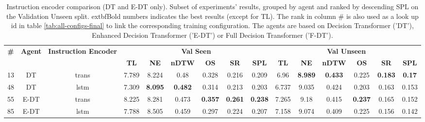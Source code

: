 \begin{table}
\centering
\caption{\label{tab:instruction_encoding}Instruction encoder comparison (DT and E-DT only). Subset of experiments' results, grouped by agent and ranked by descending SPL on the Validation Unseen split. 	extbf{Bold} numbers indicates the best results (except for TL). The rank in column \# is also used as a look up id in table \ref{tab:all-configs-final} to link the corresponding training configuration.     \newline The agents are based on Decision Transformer ('DT'), Enhanced Decision Transformer ('E-DT') or Full Decision Transformer ('F-DT').}
\begin{tabular}{@{\hskip3pt}c@{\hskip3pt}c@{\hskip3pt}c@{\hskip3pt}c@{\hskip3pt}c@{\hskip3pt}c@{\hskip3pt}c@{\hskip3pt}c@{\hskip3pt}c@{\hskip3pt}c@{\hskip3pt}c@{\hskip3pt}c@{\hskip3pt}c@{\hskip3pt}c@{\hskip3pt}c}
\toprule
\textbf{\#} & \textbf{Agent} & \textbf{Instruction Encoder} & \multicolumn{6}{c}{\textbf{Val Seen}} & \multicolumn{6}{c}{\textbf{Val Unseen}} \\
 \textbf{~} &     \textbf{~} &                   \textbf{~} &       \textbf{TL} &     \textbf{NE} &   \textbf{nDTW} &     \textbf{OS} &     \textbf{SR} &    \textbf{SPL} &         \textbf{TL} &     \textbf{NE} &   \textbf{nDTW} &     \textbf{OS} &     \textbf{SR} &   \textbf{SPL} \\
\midrule
         13 &             DT &                        trans &             7.789 &           8.224 &            0.48 &           0.328 &           0.216 &           0.209 &                6.96 &  \textbf{8.989} &  \textbf{0.433} &           0.225 &  \textbf{0.183} &  \textbf{0.17} \\
         48 &             DT &                         lstm &             7.309 &  \textbf{8.095} &  \textbf{0.482} &           0.314 &           0.213 &           0.203 &               6.737 &           9.035 &           0.424 &           0.203 &           0.163 &          0.153 \\
         55 &           E-DT &                        trans &             8.225 &           8.281 &           0.473 &  \textbf{0.357} &  \textbf{0.261} &  \textbf{0.238} &               7.265 &            9.18 &           0.415 &  \textbf{0.237} &           0.165 &          0.152 \\
         85 &           E-DT &                         lstm &             7.788 &           8.505 &           0.459 &           0.297 &           0.224 &           0.207 &               7.158 &           9.074 &           0.409 &           0.225 &           0.156 &          0.142 \\
\bottomrule
\end{tabular}
\end{table}
